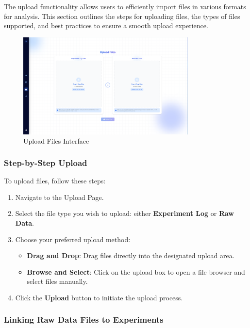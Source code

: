 \documentclass[12pt]{article}
\begin{document}
The upload functionality allows users to efficiently import files in various
formats for analysis. This section outlines the steps for uploading files, the
types of files supported, and best practices to ensure a smooth upload
experience.

\begin{figure}[H]
    \centering
    \includegraphics[width=0.8\textwidth]{./Diagrams/Upload.png}
    \caption{Upload Files Interface}
\end{figure}

\subsubsection{Step-by-Step Upload}
To upload files, follow these steps:
\begin{enumerate}
    \item Navigate to the Upload Page.
    \item Select the file type you wish to upload: either \textbf{Experiment
    Log} or \textbf{Raw Data}.
    \item Choose your preferred upload method:
    \begin{itemize}
        \item \textbf{Drag and Drop}: Drag files directly into the designated
        upload area.
        \item \textbf{Browse and Select}: Click on the upload box to open a file
        browser and select files manually.
    \end{itemize}
    \item Click the \textbf{Upload} button to initiate the upload process.
\end{enumerate}

\subsubsection{Linking Raw Data Files to Experiments}
\end{document}
